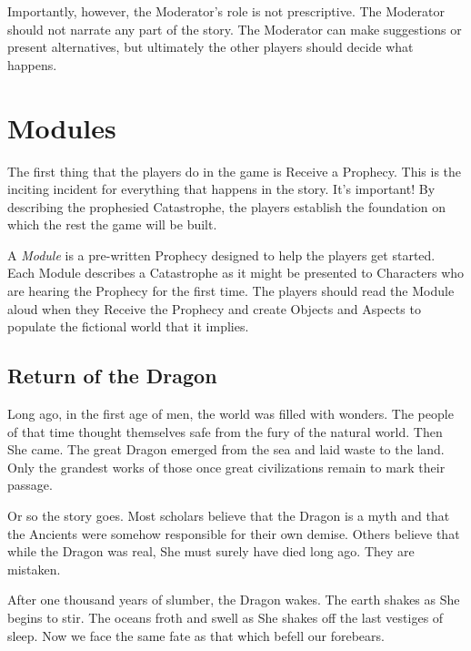 \documentclass[12pt, a5paper, parskip=half-]{scrartcl}
\begin{document}
Importantly, however, the Moderator's role is not prescriptive.  The Moderator should not narrate any part of the story. The Moderator can make suggestions or present alternatives, but ultimately the other players should decide what happens.

\newpage

\section*{Modules}
The first thing that the players do in the game is Receive a Prophecy.  
This is the inciting incident for everything that happens in the story.
It's important!
By describing the prophesied Catastrophe, the players establish the foundation on which the rest the game will be built.

A \emph{Module} is a pre-written Prophecy designed  to help the players get started.
Each Module describes a Catastrophe as it might be presented to Characters who are hearing the Prophecy for the first time.  The players should read the Module aloud when they Receive the Prophecy and create Objects and Aspects to populate the fictional world that it implies.

\subsection*{Return of the Dragon}
Long ago, in the first age of men, the world was filled with wonders. 
The people of that time thought themselves safe from the fury of the natural world.
Then She came.
The great Dragon emerged from the sea and laid waste to the land.
Only the grandest works of those once great civilizations remain to mark their passage.

Or so the story goes.
Most scholars believe that the Dragon is a myth and that the Ancients were somehow responsible for their own demise.
Others believe that while the Dragon was real, She must surely have died long ago.
They are mistaken. 

After one thousand years of slumber, the Dragon wakes. 
The earth shakes as She begins to stir.
The oceans froth and swell as She shakes off the last vestiges of sleep.
Now we face the same fate as that which befell our forebears.

\newpage

\end{document}
